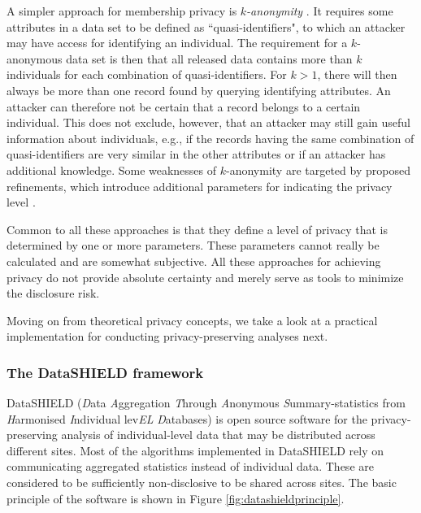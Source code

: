 \documentclass[12pt]{article}
\begin{document}
A simpler approach for membership privacy is {\em $k$-anonymity} \citep{sweeney_k_anonymity_2012}.
It requires some attributes in a data set to be defined as ``quasi-identifiers", to which an attacker may have access for identifying an individual.
The requirement for a $k$-anonymous data set is then that all released data contains more than $k$ individuals for each combination of quasi-identifiers.
For $k > 1$, there will then always be more than one record found by querying identifying attributes.
An attacker can therefore not be certain that a record belongs to a certain individual.
This does not exclude, however, that an attacker may still gain useful information about individuals, e.g., if the records having the same combination of quasi-identifiers are very similar in the other attributes or if an attacker has additional knowledge.
Some weaknesses of $k$-anonymity are targeted by proposed refinements, which introduce additional parameters for indicating the privacy level \citep{machanavajjhala_l-diversity_2007, li_t-closeness:_2007}.

Common to all these approaches is that they define a level of privacy that is determined by one or more parameters.
These parameters cannot really be calculated and are somewhat subjective. All these approaches for achieving privacy do not provide absolute certainty and merely serve as tools to minimize the disclosure risk.

Moving on from theoretical privacy concepts, we take a look at a practical implementation for conducting privacy-preserving analyses next.

\subsubsection{The DataSHIELD framework}

DataSHIELD ({\em D}ata {\em A}ggregation {\em T}hrough
{\em A}nonymous {\em S}ummary-statistics from {\em H}armonised {\em I}ndividual
lev{\em EL} {\em D}atabases) \citep{budin-ljosne_datashield} is open source software for the privacy-preserving analysis of individual-level data that may be distributed across different sites.
Most of the algorithms implemented in DataSHIELD rely on communicating aggregated statistics instead of individual data.
These are considered to be sufficiently non-disclosive to be shared across sites.
The basic principle of the software is shown in Figure \ref{fig:datashieldprinciple}.
\end{document}
